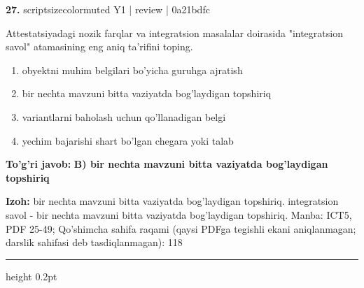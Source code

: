 \documentclass[10pt,a4paper]{article}
\begin{document}
{\bfseries\sffamily\color{ink} 27.} {scriptsizecolor{muted} Y1 | review | 0a21bdfc}
\par
Attestatsiyadagi nozik farqlar va integratsion masalalar doirasida "integratsion savol" atamasining eng aniq ta'rifini toping.
\begin{enumerate}[label=\Alph*),leftmargin=9mm]
\item obyektni muhim belgilari bo'yicha guruhga ajratish
\item bir nechta mavzuni bitta vaziyatda bog'laydigan topshiriq
\item variantlarni baholash uchun qo'llanadigan belgi
\item yechim bajarishi shart bo'lgan chegara yoki talab
\end{enumerate}
\begin{tcolorbox}[enhanced,breakable,colback=teal!4,colframe=teal!60!black,boxrule=0.45pt,arc=1.2mm,left=2.7mm,right=2.7mm,top=1.8mm,bottom=1.8mm,before skip=2mm,after skip=2mm]
{\bfseries\sffamily\color{teal}To'g'ri javob:} \textbf{B) bir nechta mavzuni bitta vaziyatda bog'laydigan topshiriq}
\par\smallskip
{\bfseries Izoh:} bir nechta mavzuni bitta vaziyatda bog'laydigan topshiriq. integratsion savol - bir nechta mavzuni bitta vaziyatda bog'laydigan topshiriq. Manba: ICT5, PDF 25-49; Qo'shimcha sahifa raqami (qaysi PDFga tegishli ekani aniqlanmagan; darslik sahifasi deb tasdiqlanmagan): 118
\end{tcolorbox}
\vspace{2mm}\hrule height 0.2pt\vspace{3mm}
\end{document}
